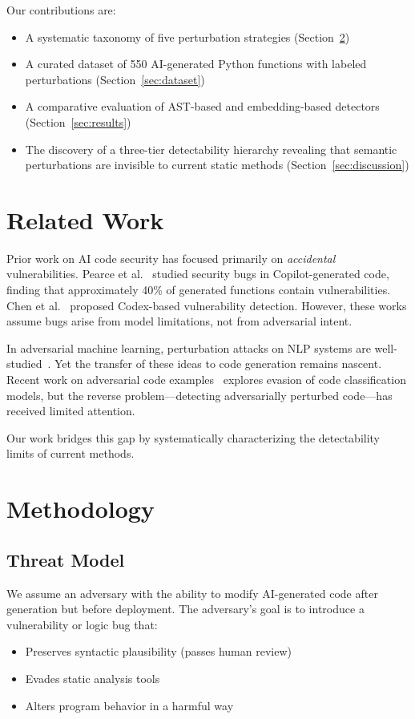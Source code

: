 \documentclass[11pt]{article}
\begin{document}
Our contributions are:
\begin{itemize}
    \item A systematic taxonomy of five perturbation strategies (Section~\ref{sec:method})
    \item A curated dataset of 550 AI-generated Python functions with labeled perturbations (Section~\ref{sec:dataset})
    \item A comparative evaluation of AST-based and embedding-based detectors (Section~\ref{sec:results})
    \item The discovery of a three-tier detectability hierarchy revealing that semantic perturbations are invisible to current static methods (Section~\ref{sec:discussion})
\end{itemize}

\section{Related Work}
\label{sec:related}

Prior work on AI code security has focused primarily on \textit{accidental} vulnerabilities. Pearce et al.~\cite{pearce2022asleep} studied security bugs in Copilot-generated code, finding that approximately 40\% of generated functions contain vulnerabilities. Chen et al.~\cite{chen2021evaluating} proposed Codex-based vulnerability detection. However, these works assume bugs arise from model limitations, not from adversarial intent.

In adversarial machine learning, perturbation attacks on NLP systems are well-studied~\cite{jia2017adversarial}. Yet the transfer of these ideas to code generation remains nascent. Recent work on adversarial code examples~\cite{yang2022natural} explores evasion of code classification models, but the reverse problem—detecting adversarially perturbed code—has received limited attention.

Our work bridges this gap by systematically characterizing the detectability limits of current methods.

\section{Methodology}
\label{sec:method}

\subsection{Threat Model}
We assume an adversary with the ability to modify AI-generated code after generation but before deployment. The adversary's goal is to introduce a vulnerability or logic bug that:
\begin{itemize}
    \item Preserves syntactic plausibility (passes human review)
    \item Evades static analysis tools
    \item Alters program behavior in a harmful way
\end{itemize}
\end{document}
